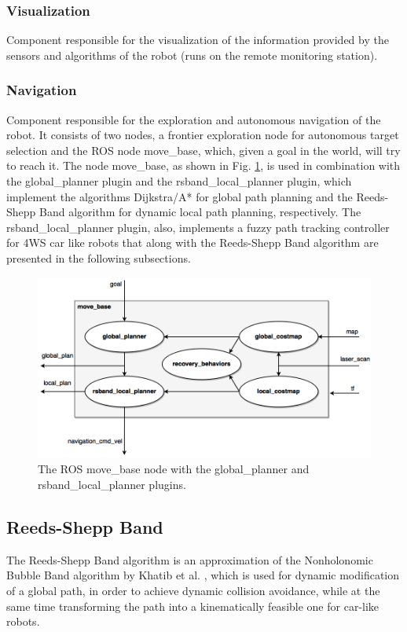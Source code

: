 \documentclass[conference]{IEEEtran}
\begin{document}
\subsubsection{Visualization}
Component responsible for the visualization of the information provided by the sensors and algorithms of the robot (runs on the remote monitoring station).
\subsubsection{Navigation}
Component responsible for the exploration and autonomous navigation of the robot. It consists of two nodes, a frontier exploration node for autonomous target selection and the ROS node move\_base, which, given a goal in the world, will try to reach it. The node move\_base, as shown in Fig. \ref{fig:move_base}, is used in combination with the global\_planner plugin and the rsband\_local\_planner plugin, which implement the algorithms Dijkstra/A* for global path planning and the Reeds-Shepp Band algorithm for dynamic local path planning, respectively. The rsband\_local\_planner plugin, also, implements a fuzzy path tracking controller for 4WS car like robots that along with the Reeds-Shepp Band algorithm are presented in the following subsections.

\begin{figure}[!ht]
	\centering
	\includegraphics[width=0.9\linewidth]{Figures/move_base_3.png}%
	\caption{The ROS move\_base node with the global\_planner and\;\;\;\;\;\;\;\;\;\;\;\;\;\;\;\;\;\; rsband\_local\_planner plugins.}
	\label{fig:move_base}
\end{figure}

\subsection{Reeds-Shepp Band}
The Reeds-Shepp Band algorithm is an approximation of the Nonholonomic Bubble Band algorithm by Khatib et al. \cite{dpm}, which is used for dynamic modification of a global path, in order to achieve dynamic collision avoidance, while at the same time transforming the path into a kinematically feasible one for car-like robots.
\end{document}

